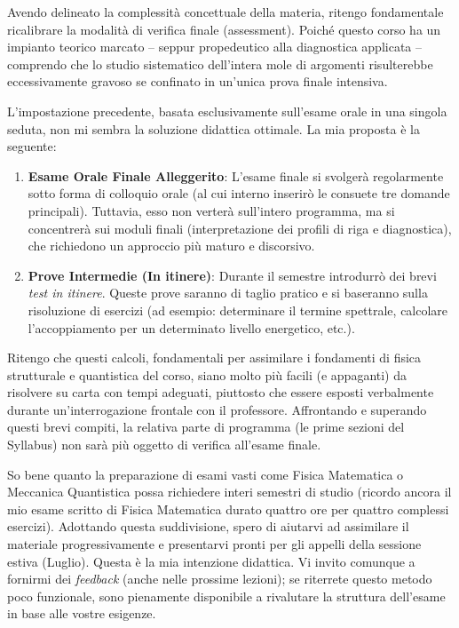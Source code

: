 Avendo delineato la complessità concettuale della materia, ritengo fondamentale ricalibrare la modalità di verifica finale (assessment). Poiché questo corso ha un impianto teorico marcato – seppur propedeutico alla diagnostica applicata – comprendo che lo studio sistematico dell'intera mole di argomenti risulterebbe eccessivamente gravoso se confinato in un'unica prova finale intensiva.

L'impostazione precedente, basata esclusivamente sull'esame orale in una singola seduta, non mi sembra la soluzione didattica ottimale. La mia proposta è la seguente:
\begin{enumerate}
    \item \textbf{Esame Orale Finale Alleggerito}: L'esame finale si svolgerà regolarmente sotto forma di colloquio orale (al cui interno inserirò le consuete tre domande principali). Tuttavia, esso non verterà sull'intero programma, ma si concentrerà sui moduli finali (interpretazione dei profili di riga e diagnostica), che richiedono un approccio più maturo e discorsivo.
    \item \textbf{Prove Intermedie (In itinere)}: Durante il semestre introdurrò dei brevi \textit{test in itinere}. Queste prove saranno di taglio pratico e si baseranno sulla risoluzione di esercizi (ad esempio: determinare il termine spettrale, calcolare l'accoppiamento per un determinato livello energetico, etc.).
\end{enumerate}

Ritengo che questi calcoli, fondamentali per assimilare i fondamenti di fisica strutturale e quantistica del corso, siano molto più facili (e appaganti) da risolvere su carta con tempi adeguati, piuttosto che essere esposti verbalmente durante un'interrogazione frontale con il professore. Affrontando e superando questi brevi compiti, la relativa parte di programma (le prime sezioni del Syllabus) non sarà più oggetto di verifica all'esame finale.

So bene quanto la preparazione di esami vasti come Fisica Matematica o Meccanica Quantistica possa richiedere interi semestri di studio (ricordo ancora il mio esame scritto di Fisica Matematica durato quattro ore per quattro complessi esercizi). Adottando questa suddivisione, spero di aiutarvi ad assimilare il materiale progressivamente e presentarvi pronti per gli appelli della sessione estiva (Luglio).
Questa è la mia intenzione didattica. Vi invito comunque a fornirmi dei \textit{feedback} (anche nelle prossime lezioni); se riterrete questo metodo poco funzionale, sono pienamente disponibile a rivalutare la struttura dell'esame in base alle vostre esigenze.

